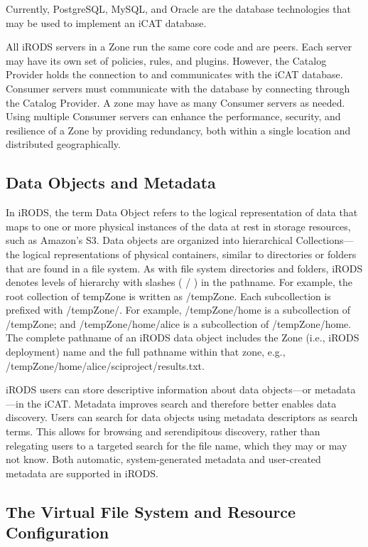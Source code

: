 \documentclass[10pt,oneside]{memoir}
\begin{document}
Currently, PostgreSQL, MySQL, and Oracle are the database technologies that may be used to implement an iCAT database.

All iRODS servers in a Zone run the same core code and are peers. Each server may have its own set of policies, rules, and plugins. However, the Catalog Provider holds the connection to and communicates with the iCAT database. Consumer servers must communicate with the database by connecting through the Catalog Provider. A zone may have as many Consumer servers as needed. Using multiple Consumer servers can enhance the performance, security, and resilience of a Zone by providing redundancy, both within a single location and distributed geographically.


\subsection{Data Objects and Metadata}

In iRODS, the term Data Object refers to the logical representation of data that maps to one or more physical instances of the data at rest in storage resources, such as Amazon's S3. Data objects are organized into hierarchical Collections---the logical representations of physical containers, similar to directories or folders that are found in a file system. As with file system directories and folders, iRODS denotes levels of hierarchy with slashes ( / ) in the pathname. For example, the root collection of tempZone is written as /tempZone. Each subcollection is prefixed with /tempZone/.  For example, /tempZone/home is a subcollection of /tempZone; and /tempZone/home/alice is a subcollection of /tempZone/home. The complete pathname of an iRODS data object includes the Zone (i.e., iRODS deployment) name and the full pathname within that zone, e.g., /tempZone/home/alice/sciproject/results.txt.

iRODS users can store descriptive information about data objects---or metadata---in the iCAT. Metadata improves search and therefore better enables data discovery. Users can search for data objects using metadata descriptors as search terms.  This allows for browsing and serendipitous discovery, rather than relegating users to a targeted search for the file name, which they may or may not know. Both automatic, system-generated metadata and user-created metadata are supported in iRODS.

\subsection{The Virtual File System and Resource Configuration}
\end{document}
